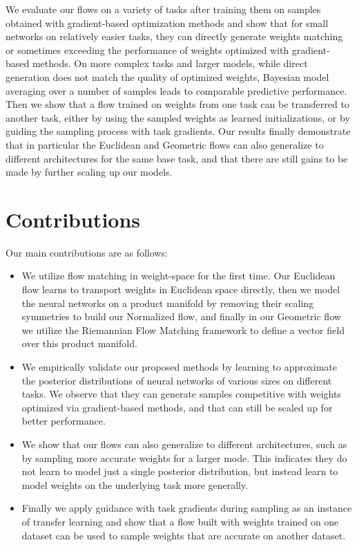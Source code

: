 We evaluate our flows on a variety of tasks after training them on samples obtained with gradient-based optimization methods and show that for small networks on relatively easier tasks, they can directly generate weights matching or sometimes exceeding the performance of weights optimized with gradient-based methods. On more complex tasks and larger models, while direct generation does not match the quality of optimized weights, Bayesian model averaging over a number of samples leads to comparable predictive performance. Then we show that a flow trained on weights from one task can be transferred to another task, either by using the sampled weights as learned initializations, or by guiding the sampling process with task gradients. Our results finally demonstrate that in particular the Euclidean and Geometric flows can also generalize to different architectures for the same base task, and that there are still gains to be made by further scaling up our models. 

\section{Contributions}

Our main contributions are as follows:
\begin{itemize}
    \item We utilize flow matching in weight-space for the first time. Our Euclidean flow learns to transport weights in Euclidean space directly, then we model the neural networks on a product manifold by removing their scaling symmetries to build our Normalized flow, and finally in our Geometric flow we utilize the Riemannian Flow Matching framework to define a vector field over this product manifold. 
    \item We empirically validate our proposed methods by learning to approximate the posterior distributions of neural networks of various sizes on different tasks. We observe that they can generate samples competitive with weights optimized via gradient-based methods, and that can still be scaled up for better performance. 
    \item We show that our flows can also generalize to different architectures, such as by sampling more accurate weights for a larger mode. This indicates they do not learn to model just a single posterior distribution, but instead learn to model weights on the underlying task more generally. 
    \item Finally we apply guidance with task gradients during sampling as an instance of transfer learning and show that a flow built with weights trained on one dataset can be used to sample weights that are accurate on another dataset. 
\end{itemize}
